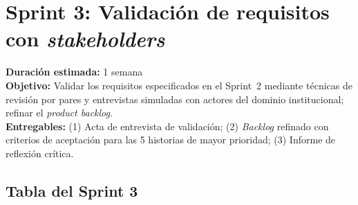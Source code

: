 \section*{Sprint 3: Validación de requisitos con \textit{stakeholders}}
\label{sprint:3}

\begin{tcolorbox}[sprintBox, title={Sprint 3 — Validación de requisitos con
  \textit{stakeholders}}]
  \textbf{Duración estimada:} 1 semana\\
  \textbf{Objetivo:} Validar los requisitos especificados en el Sprint~2
  mediante técnicas de revisión por pares y entrevistas simuladas con
  actores del dominio institucional; refinar el \textit{product backlog}.\\
  \textbf{Entregables:} (1) Acta de entrevista de validación; (2)
  \textit{Backlog} refinado con criterios de aceptación para las 5
  historias de mayor prioridad; (3) Informe de reflexión crítica.
\end{tcolorbox}

\bigskip

\subsection*{Tabla del Sprint 3}

